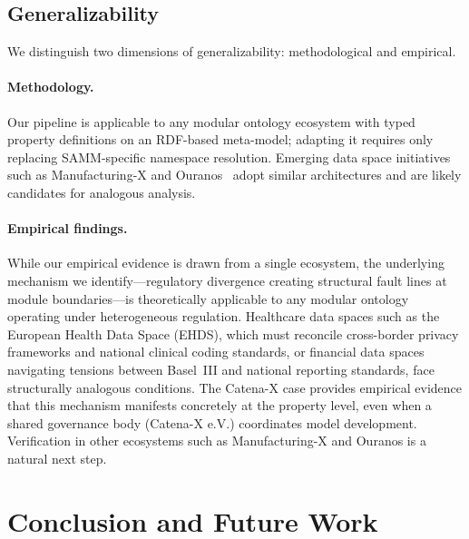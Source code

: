 \documentclass[]{ceurart}
\begin{document}
\subsection{Generalizability}

We distinguish two dimensions of generalizability: methodological and
empirical.

\paragraph{Methodology.}
Our pipeline is applicable to any modular ontology ecosystem with typed
property definitions on an RDF-based meta-model; adapting it requires
only replacing SAMM-specific namespace resolution. Emerging data space
initiatives such as Manufacturing-X and
Ouranos~\cite{ishihara2025interoperable} adopt similar architectures
and are likely candidates for analogous analysis.

\paragraph{Empirical findings.}
While our empirical evidence is drawn from a single ecosystem, the
underlying mechanism we identify---regulatory divergence creating
structural fault lines at module boundaries---is theoretically
applicable to any modular ontology operating under heterogeneous
regulation. Healthcare data spaces such as the European Health Data
Space (EHDS), which must reconcile cross-border privacy frameworks and
national clinical coding standards, or financial data spaces navigating
tensions between Basel~III and national reporting standards, face
structurally analogous conditions. The Catena-X case provides empirical evidence that this
mechanism manifests concretely at the property level, even when a shared
governance body (Catena-X e.V.) coordinates model development.
Verification in other ecosystems such as Manufacturing-X and Ouranos is
a natural next step.

\section{Conclusion and Future Work}\label{sec:conclusion}
\end{document}
